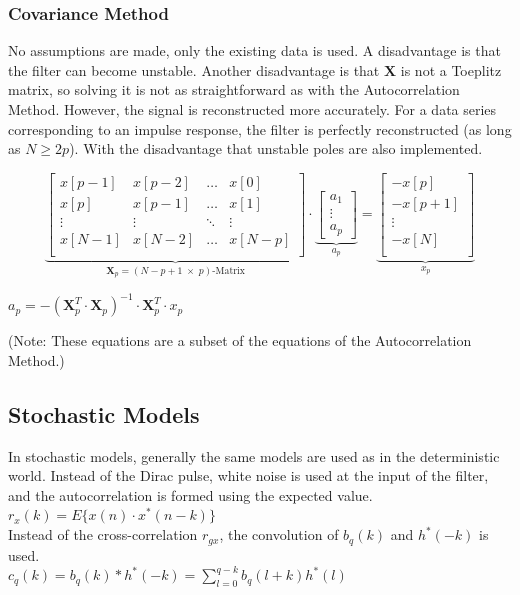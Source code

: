 		\subsubsection{Covariance Method  }
		No assumptions are made, only the existing data is used. A disadvantage is that the filter can become unstable.
		Another disadvantage is that \(\bm X\) is not a Toeplitz matrix, so solving it is not as straightforward as with the Autocorrelation Method.
		However, the signal is reconstructed more accurately.
		For a data series corresponding to an impulse response, the filter is perfectly reconstructed (as long as \(N \ge 2p\)).
		With the disadvantage that unstable poles are also implemented.
		\begin{minipage}{0.7\linewidth}
			\small
			$$
			\underbrace{\begin{bmatrix}
				x[p-1] & x[p-2] & \hdots & x[0] \\
				x[p] & x[p-1] & \hdots & x[1] \\
				\vdots & \vdots & \ddots & \vdots \\
				x[N-1] & x[N-2] & \hdots & x[N-p] \\
			\end{bmatrix}  }_{\bm X_p=(N-p+1 \; \times \; p)\text{-Matrix}} \cdot \underbrace{\begin{bmatrix}
				a_1 \\
				\vdots \\
				a_p
			\end{bmatrix}  }_{a_p}= \underbrace{\begin{bmatrix}
					-x[p]\\
					-x[p+1]\\
				\vdots \\
					-x[N]\\
			\end{bmatrix}}_{x_p}
			$$ \normalsize
		\end{minipage}
		\begin{minipage}[t]{0.3\linewidth}
			$a_p = -\left(\bm X_p^T \cdot \bm  X_p\right)^{-1} \cdot \bm X_p^T \cdot x_p$
		\end{minipage}
		(Note: These equations are a subset of the equations of the Autocorrelation Method.)


\subsection{Stochastic Models}
In stochastic models, generally the same models are used as in the deterministic world.
Instead of the Dirac pulse, white noise is used at the input of the filter, and the autocorrelation is formed using the expected value.
$r_x(k)=E\{x(n) \cdot x^*(n-k)\}$\\
Instead of the cross-correlation $r_{gx}$, the convolution of $b_q(k)$ and $h^*(-k)$ is used.\\
$c_q(k) = b_q(k) \ast h^*(-k) = \sum_{l=0}^{q-k} b_q(l+k) h^*(l)$

